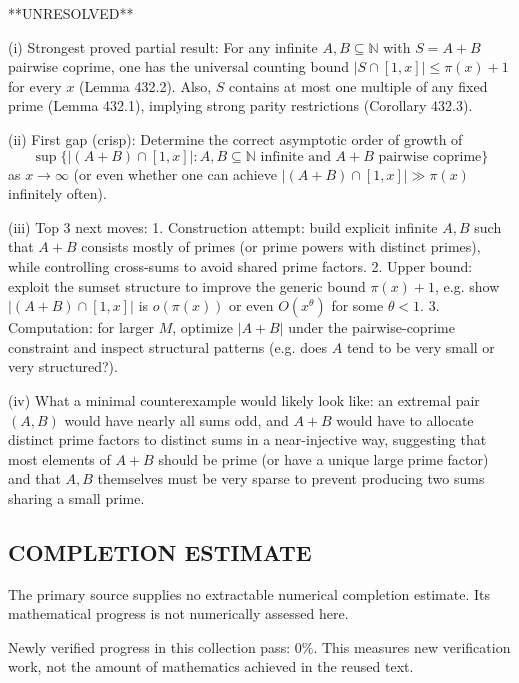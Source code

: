 **UNRESOLVED**

(i) Strongest proved partial result: For any infinite $A,B\subseteq\mathbb N$ with $S=A+B$ pairwise coprime, one has the universal counting bound $|S\cap[1,x]|\le \pi(x)+1$ for every $x$ (Lemma 432.2). Also, $S$ contains at most one multiple of any fixed prime (Lemma 432.1), implying strong parity restrictions (Corollary 432.3).

(ii) First gap (crisp): Determine the correct asymptotic order of growth of
\[\sup\{|(A+B)\cap[1,x]|: A,B\subseteq\mathbb N\text{ infinite and }A+B\text{ pairwise coprime}\}\]
as $x\to\infty$ (or even whether one can achieve $|(A+B)\cap[1,x]|\gg \pi(x)$ infinitely often).

(iii) Top 3 next moves:
1. Construction attempt: build explicit infinite $A,B$ such that $A+B$ consists mostly of primes (or prime powers with distinct primes), while controlling cross-sums to avoid shared prime factors.
2. Upper bound: exploit the sumset structure to improve the generic bound $\pi(x)+1$, e.g. show $|(A+B)\cap[1,x]|$ is $o(\pi(x))$ or even $O(x^\theta)$ for some $\theta<1$.
3. Computation: for larger $M$, optimize $|A+B|$ under the pairwise-coprime constraint and inspect structural patterns (e.g. does $A$ tend to be very small or very structured?).

(iv) What a minimal counterexample would likely look like: an extremal pair $(A,B)$ would have nearly all sums odd, and $A+B$ would have to allocate distinct prime factors to distinct sums in a near-injective way, suggesting that most elements of $A+B$ should be prime (or have a unique large prime factor) and that $A,B$ themselves must be very sparse to prevent producing two sums sharing a small prime.




\subsection*{COMPLETION ESTIMATE}
The primary source supplies no extractable numerical completion estimate. Its mathematical progress is not numerically assessed here.

Newly verified progress in this collection pass: $0\%$. This measures new verification work, not the amount of mathematics achieved in the reused text.
